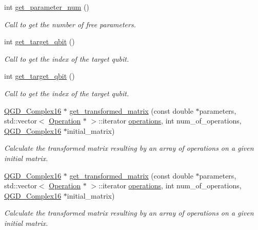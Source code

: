 \begin{DoxyCompactItemize}
int \hyperlink{class_operation__block_af7ff4a8876a7b1c062ea2f35efac18b0}{get\+\_\+parameter\+\_\+num} ()
\begin{DoxyCompactList}\small\item\em Call to get the number of free parameters. \end{DoxyCompactList}\item 
int \hyperlink{class_operation_a55eee2ad4b90be085b1ec2ce018502f8}{get\+\_\+target\+\_\+qbit} ()
\begin{DoxyCompactList}\small\item\em Call to get the index of the target qubit. \end{DoxyCompactList}\item 
int \hyperlink{class_operation_a55eee2ad4b90be085b1ec2ce018502f8}{get\+\_\+target\+\_\+qbit} ()
\begin{DoxyCompactList}\small\item\em Call to get the index of the target qubit. \end{DoxyCompactList}\item 
\hyperlink{struct_q_g_d___complex16}{Q\+G\+D\+\_\+\+Complex16} $\ast$ \hyperlink{class_decomposition___base_a8e26f5a31475e4d5a2e9c785a2a57dd9}{get\+\_\+transformed\+\_\+matrix} (const double $\ast$parameters, std\+::vector$<$ \hyperlink{class_operation}{Operation} $\ast$ $>$\+::iterator \hyperlink{class_operation__block_a1efec4139888e591b59acd7b84497af1}{operations}, int num\+\_\+of\+\_\+operations, \hyperlink{struct_q_g_d___complex16}{Q\+G\+D\+\_\+\+Complex16} $\ast$initial\+\_\+matrix)
\begin{DoxyCompactList}\small\item\em Calculate the transformed matrix resulting by an array of operations on a given initial matrix. \end{DoxyCompactList}\item 
\hyperlink{struct_q_g_d___complex16}{Q\+G\+D\+\_\+\+Complex16} $\ast$ \hyperlink{class_decomposition___base_a74159036ee14ac2c33a0ccd45de782d5}{get\+\_\+transformed\+\_\+matrix} (const double $\ast$parameters, std\+::vector$<$ \hyperlink{class_operation}{Operation} $\ast$ $>$\+::iterator \hyperlink{class_operation__block_a1efec4139888e591b59acd7b84497af1}{operations}, int num\+\_\+of\+\_\+operations, \hyperlink{struct_q_g_d___complex16}{Q\+G\+D\+\_\+\+Complex16} $\ast$initial\+\_\+matrix)
\begin{DoxyCompactList}\small\item\em Calculate the transformed matrix resulting by an array of operations on a given initial matrix. \end{DoxyCompactList}\item 

\end{DoxyCompactItemize}
